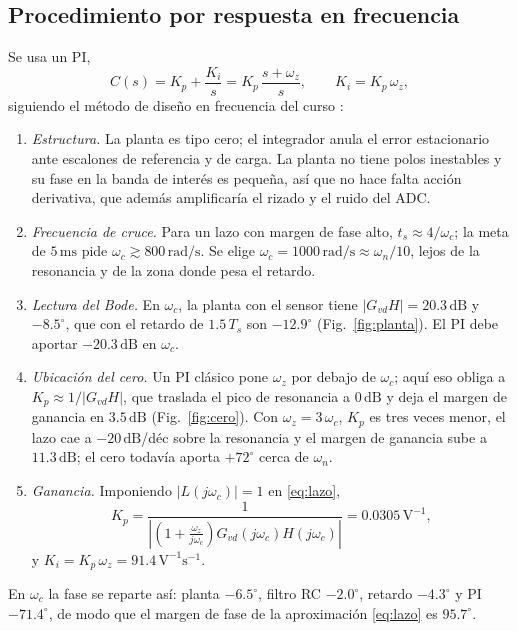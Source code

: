 \documentclass[conference,letterpaper]{IEEEtran}
\newcommand{\unit}[1]{\,\mathrm{#1}}
\begin{document}
\subsection{Procedimiento por respuesta en frecuencia}
Se usa un PI,
\begin{equation}
C(s)=K_p+\frac{K_i}{s}=K_p\,\frac{s+\omega_z}{s},\qquad K_i=K_p\,\omega_z,\label{eq:pi}
\end{equation}
siguiendo el método de diseño en frecuencia del curso \cite{clase}:
\begin{enumerate}
\item \emph{Estructura.} La planta es tipo cero; el integrador anula el error estacionario ante escalones de referencia y de carga. La planta no tiene polos inestables y su fase en la banda de interés es pequeña, así que no hace falta acción derivativa, que además amplificaría el rizado y el ruido del ADC.
\item \emph{Frecuencia de cruce.} Para un lazo con margen de fase alto, $t_s\approx4/\omega_c$; la meta de $5\unit{ms}$ pide $\omega_c\gtrsim 800\unit{rad/s}$. Se elige $\omega_c=1000\unit{rad/s}\approx\omega_n/10$, lejos de la resonancia y de la zona donde pesa el retardo.
\item \emph{Lectura del Bode.} En $\omega_c$, la planta con el sensor tiene $|G_{vd}H|=20.3\unit{dB}$ y $-8.5^\circ$, que con el retardo de $1.5\,T_s$ son $-12.9^\circ$ (Fig.~\ref{fig:planta}). El PI debe aportar $-20.3\unit{dB}$ en $\omega_c$.
\item \emph{Ubicación del cero.} Un PI clásico pone $\omega_z$ por debajo de $\omega_c$; aquí eso obliga a $K_p\approx1/|G_{vd}H|$, que traslada el pico de resonancia a $0\unit{dB}$ y deja el margen de ganancia en $3.5\unit{dB}$ (Fig.~\ref{fig:cero}). Con $\omega_z=3\,\omega_c$, $K_p$ es tres veces menor, el lazo cae a $-20\unit{dB}$/déc sobre la resonancia y el margen de ganancia sube a $11.3\unit{dB}$; el cero todavía aporta $+72^\circ$ cerca de $\omega_n$.
\item \emph{Ganancia.} Imponiendo $|L(j\omega_c)|=1$ en \eqref{eq:lazo},
\begin{equation}
K_p=\frac{1}{\left|\left(1+\frac{\omega_z}{j\omega_c}\right)G_{vd}(j\omega_c)H(j\omega_c)\right|}=0.0305\unit{V^{-1}},
\end{equation}
y $K_i=K_p\,\omega_z=91.4\unit{V^{-1}s^{-1}}$.
\end{enumerate}
En $\omega_c$ la fase se reparte así: planta $-6.5^\circ$, filtro RC $-2.0^\circ$, retardo $-4.3^\circ$ y PI $-71.4^\circ$, de modo que el margen de fase de la aproximación \eqref{eq:lazo} es $95.7^\circ$.
\end{document}
